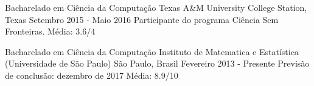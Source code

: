 \documentclass[11pt, a4paper]{awesome-cv-res}
\begin{document}
\makecvheader
\makecvfooter
  {}
  {}
  {\thepage}



\begin{cventries}
\cventry
{Bacharelado em Ciência da Computação}
{Texas A\&M University}
{College Station, Texas}
{Setembro 2015 - Maio 2016}
{Participante do programa Ciência Sem Fronteiras. \newline Média: 3.6/4}
\newline 
\newline

\cventry
{Bacharelado em Ciência da Computação} %
{Instituto de Matematica e Estatística (Universidade de São Paulo)} %
{São Paulo, Brasil} %
{Fevereiro 2013 - Presente} %
{Previsão de conclusão: dezembro de 2017 \newline Média: 8.9/10}
\end{cventries}
\end{document}
